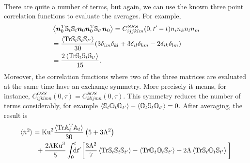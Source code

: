 \documentclass[thesis.tex]{subfiles}
\begin{document}
\begin{align*}
\end{align*}
There are quite a number of terms, but again, we can use the known three point correlation functions
 to evaluate the averages. For example, 
\begin{align*}
	&\left\langle\mbox{\boldmath$n$}_0^{\mathrm T}\mathbb{S}_t\mathbb{S}_t \mbox{\boldmath$n$}_0 \mbox{\boldmath$n$}_{0}^{\mathrm T}\mathbb{S}_{t'}\mbox{\boldmath$n$}_{0} \right\rangle
	= C^{SSS}_{ijjklm}(0, t'-t)n_in_kn_ln_m \\
	&= \frac{\left\langle\mbox{Tr} \mathbb{S}_t\mathbb{S}_{t}\mathbb{S}_{t'}\right\rangle}{30} (3 \delta_{im} \delta_{kl}+3 \delta_{il} \delta_{km}-2 \delta_{ik} \delta_{lm})\\
	&= \frac{2\left\langle\mbox{Tr} \mathbb{S}_t\mathbb{S}_{t}\mathbb{S}_{t'}\right\rangle}{15}.
\end{align*}
Moreover, the correlation functions where two of the three matrices are evaluated at the same time have an exchange symmetry. More precisely it means, for instance, $C^{OSS}_{ijklmn}(0,\tau)=C^{SOS}_{klijmn}(0,\tau)$. This symmetry reduces the number of terms considerably, for example $\langle \mathbb{S}_t \mathbb{O}_t \mathbb{O}_{t'}\rangle - \langle \mathbb{O}_t \mathbb{S}_t \mathbb{O}_{t'}\rangle =0$. After averaging, the result is
\begin{align*}
\langle \dot n^2\rangle &=\mbox{Ku}^2\frac{\langle\mbox{Tr}\mathbb{A}_t^{\mathrm T} \mathbb{A}_t\rangle}{30}\left(5 + 3 \Lambda^2\right) \\
	&\,\,\,+ \frac{2 \Lambda \mbox{Ku}^3}{5} \int_0^{t}\!\!\!\!{\rm d}t' \bigg[\frac{3 \Lambda^2}{7}\left\langle\mbox{Tr} \mathbb{S}_t\mathbb{S}_{t}\mathbb{S}_{t'}\right\rangle - \left\langle\mbox{Tr} \mathbb{O}_t\mathbb{O}_{t}\mathbb{S}_{t'}\right\rangle + 2 \Lambda \left\langle\mbox{Tr} \mathbb{S}_t\mathbb{O}_{t}\mathbb{S}_{t'}\right\rangle\bigg]
\end{align*}
\end{document}
